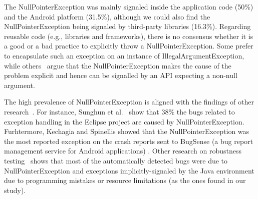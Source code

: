 \documentclass[conference]{IEEEtran}
\begin{document}
 The NullPointerException was mainly signaled inside the application code (50\%) and the Android platform (31.5\%),
 although we could also find the NullPointerException being signaled by third-party libraries (16.3\%). 
Regarding reusable code (e.g., libraries and frameworks), there is no consensus whether it is a good or a bad practice to 
explicitly throw a NullPointerException. Some prefer to encapsulate such an exception on
an instance of IllegalArgumentException, while others~\cite{bloch2008effective} argue that the
NullPointerException makes the cause of the problem explicit and hence 
can be signalled by an API expecting a non-null argument.

The high prevalence of NullPointerException is aligned with the
findings of other 
research~\cite{kim2013predicting,fraser20131600,csallner2004jcrasher,kechagia2014}. 
For instance, Sunghun et
al.~\cite{kim2013predicting} show that 38\% the bugs related to
exception handling in the Eclipse project
 are caused by NullPointerException.
Furhtermore, Kechagia and Spinellis showed that the NullPointerException was the  
most reported exception on the crash reports sent to BugSense (a bug report 
management service for Android applications)  \cite{kechagia2014}.
Other research on robustness testing~\cite{maji2012empirical,csallner2004jcrasher} shows that most of the automatically 
detected bugs were due to NullPointerException and exceptions
implicitly-signaled by the Java 
environment due to programming mistakes or resource limitations
 (as the ones found in our study).


\end{document}
